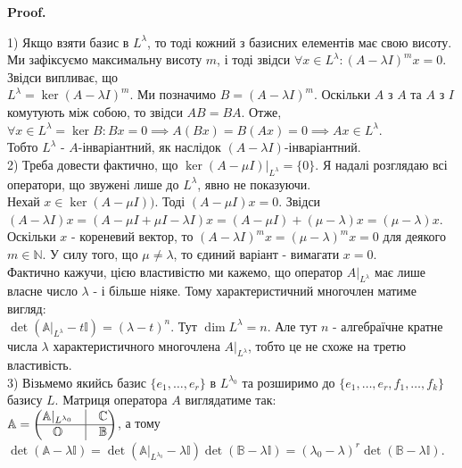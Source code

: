 \documentclass[a4paper, 10pt]{article}
\makeatletter
\theoremstyle{theoremdd}
\renewenvironment{proof}[1][Proof.\\]{\par
\pushQED{\hfill \qed}%
\normalfont \topsep6\p@\@plus6\p@\relax
\trivlist
\item\relax
{\bfseries
#1\@addpunct{.}}\hspace\labelsep\ignorespaces
}{%
\popQED\endtrivlist\@endpefalse
}
\makeatother
\begin{document}
\begin{proof}
1) Якщо взяти базис в $L^\lambda$, то тоді кожний з базисних елементів має свою висоту. Ми зафіксуємо максимальну висоту $m$, і тоді звідси $\forall x \in L^\lambda: (A-\lambda I)^m x = 0$. Звідси випливає, що \\ $L^\lambda = \ker (A-\lambda I)^m$. Ми позначимо $B = (A-\lambda I)^m$. Оскільки $A$ з $A$ та $A$ з $I$ комутують між собою, то звідси $AB = BA$. Отже, $\forall x \in L^\lambda = \ker B: B x =0 \implies A(Bx) = B(Ax) = 0 \implies Ax \in L^\lambda$.\\
Тобто $L^\lambda$ - $A$-інваріантний, як наслідок $(A-\lambda I)$-інваріантний.
\bigskip \\
2) Треба довести фактично, що $\ker (A-\mu I)|_{L^\lambda} = \{0\}$. Я надалі розглядаю всі оператори, що звужені лише до $L^\lambda$, явно не показуючи.\\
Нехай $x \in \ker (A-\mu I))$. Тоді $(A-\mu I)x = 0$. Звідси\\
$(A-\lambda I)x = (A-\mu I + \mu I - \lambda I)x = (A-\mu I) + (\mu -\lambda)x = (\mu-\lambda)x$.\\
Оскільки $x$ - кореневий вектор, то $(A-\lambda I)^m x = (\mu - \lambda)^m x = 0$ для деякого $m \in \mathbb{N}$. У силу того, що $\mu \neq \lambda$, то єдиний варіант - вимагати $x =0$.
\bigskip \\
Фактично кажучи, цією властивістю ми кажемо, що оператор $A|_{L^\lambda}$ має лише власне число $\lambda$ - і більше ніяке. Тому характеристичний многочлен матиме вигляд:\\
$\det(\mathbb{A}|_{L^{\lambda}} - t \mathbb{I}) = (\lambda - t)^n$. Тут $\dim L^{\lambda} = n$. Але тут $n$ - алгебраїчне кратне числа $\lambda$ характеристичного многочлена $A|_{L^\lambda}$, тобто це не схоже на третю властивість.
\bigskip \\
3) Візьмемо якийсь базис $\{e_1,\dots,e_r\}$ в $L^{\lambda_0}$ та розширимо до $\{e_1,\dots,e_r,f_1,\dots,f_k\}$ базису $L$. Матриця оператора $A$ виглядатиме так:\\
$\mathbb{A} = \begin{pmatrix}
 \mathbb{A}|_{L^{\lambda_0}}  & \vline & \mathbb{C} \\
 \hline
 \mathbb{O} & \vline & \mathbb{B}
\end{pmatrix}$, а тому $\det (\mathbb{A}-\lambda \mathbb{I}) = \det (\mathbb{A}|_{L^{\lambda_0}}-\lambda \mathbb{I}) \det (\mathbb{B} - \lambda \mathbb{I}) = (\lambda_0 - \lambda)^r \det (\mathbb{B} - \lambda \mathbb{I})$.\\

\end{proof}
\end{document}
